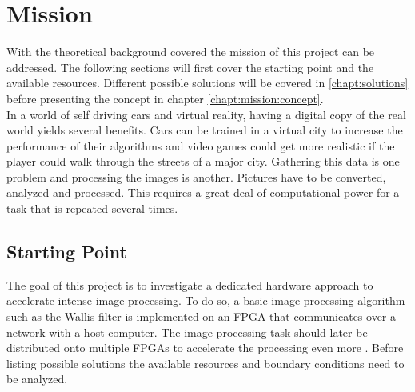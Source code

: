 %
%
\chapter{Mission} \label{chapt:mission}
With the theoretical background covered the mission of this project can be
addressed.
The following sections will first cover the starting point and the available resources. Different possible solutions will be covered in \ref{chapt:solutions} before presenting the concept in chapter \ref{chapt:mission:concept}. \\

In a world of self driving cars and virtual reality, having a digital copy of
the real world yields several benefits. Cars can be trained in a virtual city
to increase the performance of their algorithms and video games could get more
realistic if the player could walk through the streets of a major city. Gathering this data is one problem and processing the images is another. Pictures have to be converted, analyzed and processed. This requires a great deal of computational power for a task that is repeated several times.

%
%
\section{Starting Point}
The goal of this project is to investigate a dedicated hardware approach to
accelerate intense image processing. To do so, a basic image processing
algorithm such as the Wallis filter is implemented on an FPGA that communicates
over a network with a host computer. The image processing task should later be
distributed onto multiple FPGAs to accelerate the processing even more 
\cite{nomokoReqs}. Before listing possible solutions the available resources and
boundary conditions need to be analyzed.


